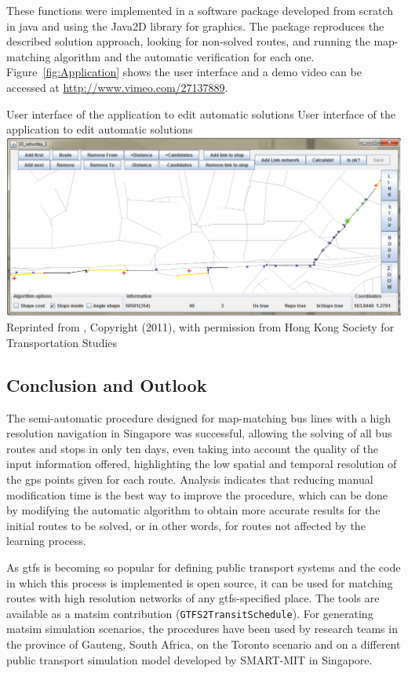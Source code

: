 These functions were implemented in a software package developed from scratch in \gls{java} and using the Java2D library for graphics. The package reproduces the described solution approach, looking for non-solved routes, and running the map-matching algorithm and the automatic verification for each one. Figure~\ref{fig:Application} shows the user interface and a demo video can be accessed at \url{http://www.vimeo.com/27137889}.

\createfigure
{User interface of the application to edit automatic solutions}
{User interface of the application to edit automatic solutions}
{\label{fig:Application}}
{\includegraphics[width=1.0\textwidth]{extending/figures/semiAuto/Application.png}}
{Reprinted from \citet[][p.757]{Ordonez_HKSTS_2011}, Copyright (2011), with permission from Hong Kong Society for Transportation Studies}

\subsection{Conclusion and Outlook}
The semi-automatic procedure designed for map-matching bus lines with a high resolution navigation in Singapore was successful, allowing the solving of all bus routes and stops in only ten days, even taking into account the quality of the input information offered, highlighting the low spatial and temporal resolution of the \gls{gps} points given for each route. Analysis indicates that reducing manual modification time is the best way to improve the procedure, which can be done by modifying the automatic algorithm to obtain more accurate results for the initial routes to be solved, or in other words, for routes not affected by the learning process.

As \gls{gtfs} is becoming so popular for defining public transport systems and the code in which this process is implemented is open source, it can be used for matching routes with high resolution networks of any \gls{gtfs}-specified place. The tools are available as a \gls{matsim} \gls{contribution} (\lstinline|GTFS2TransitSchedule|). For generating \gls{matsim} simulation scenarios, the procedures have been used by research teams in the province of Gauteng, South Africa, on the Toronto scenario and on a different public transport simulation model developed by SMART-MIT in Singapore.

